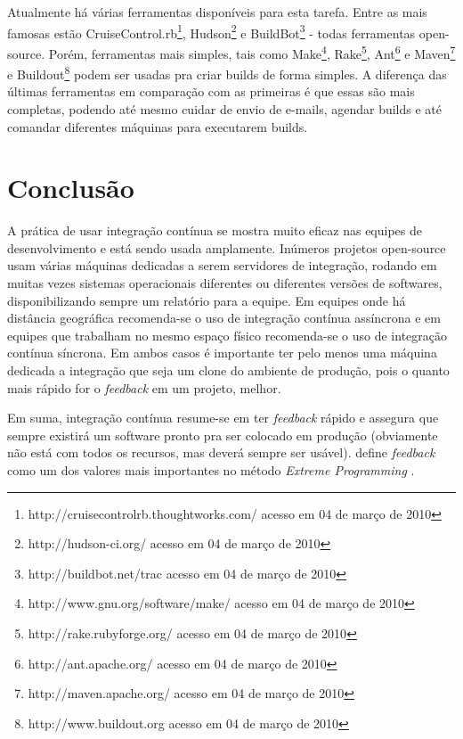 \documentclass[10pt,a4paper,font=plain]{abnt}
\begin{document}
Atualmente há várias ferramentas disponíveis para esta tarefa. Entre as mais famosas estão CruiseControl.rb\footnote{http://cruisecontrolrb.thoughtworks.com/ acesso em 04 de março de 2010}, Hudson\footnote{http://hudson-ci.org/ acesso em 04 de março de 2010} e BuildBot\footnote{http://buildbot.net/trac acesso em 04 de março de 2010} - todas ferramentas open-source. Porém, ferramentas mais simples, tais como Make\footnote{http://www.gnu.org/software/make/ acesso em 04 de março de 2010}, Rake\footnote{ http://rake.rubyforge.org/ acesso em 04 de março de 2010}, Ant\footnote{http://ant.apache.org/ acesso em 04 de março de 2010} e Maven\footnote{http://maven.apache.org/ acesso em 04 de março de 2010} e Buildout\footnote{http://www.buildout.org acesso em 04 de março de 2010} podem ser usadas pra criar builds de forma simples. A diferença das últimas ferramentas em comparação com as primeiras é que essas são mais completas, podendo até mesmo cuidar de envio de e-mails, agendar builds e até comandar diferentes máquinas para executarem builds.

\section{Conclusão}

A prática de usar integração contínua se mostra muito eficaz nas equipes de desenvolvimento e está sendo usada amplamente. Inúmeros projetos open-source usam várias máquinas dedicadas a serem servidores de integração, rodando em muitas vezes sistemas operacionais diferentes ou diferentes versões de softwares, disponibilizando sempre um relatório para a equipe. Em equipes onde há distância geográfica recomenda-se o uso de integração contínua assíncrona e em equipes que trabalham no mesmo espaço físico recomenda-se o uso de integração contínua síncrona. Em ambos casos é importante ter pelo menos uma máquina dedicada a integração que seja um clone do ambiente de produção, pois o quanto mais rápido for o \textit{feedback} em um projeto, melhor.

Em suma, integração contínua resume-se em ter \textit{feedback} rápido e assegura que sempre existirá um software pronto pra ser colocado em produção (obviamente não está com todos os recursos, mas deverá sempre ser usável).  define \textit{feedback} como um dos valores mais importantes no método \textit{Extreme Programming} \cite{XP}.


\end{document}
